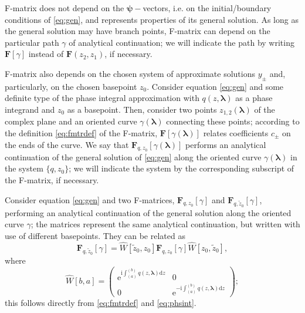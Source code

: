 \documentclass[atmp]{ipart_v1}
\def\rmd{\mathrm{d}}
\def\rme{\mathrm{e}}
\def\rmi{\mathrm{i}}
\def\lmbd{\bm{\lambda}}
\def\psii{\bm\psi}
\def\F{\bm{F}}
\def\W{\widehat{W}}
\newcommand\eref[1]{\eqref{#1}}
\newcommand\phsintgrnd[1][z]{q(#1,\lmbd)}
\newcommand\phsintgrl[3][z]{\int_{#2}^{#3} \phsintgrnd[#1] \rmd #1}
\begin{document}
F-matrix does not depend on the $\psii-$vectors, i.e. on the initial/boundary conditions 
of \eref{eq:gen}, and represents properties of its general solution. 
As long as the general solution may have branch points, 
F-matrix can depend on the particular path $\gamma$ of analytical continuation; 
we will indicate the path by writing $\F[\gamma]$ instead of $\F(z_2,z_1)$, if necessary.
 
F-matrix also depends on the chosen system of approximate solutions $y_\pm$ and, 
particularly, on the chosen basepoint $z_0$. Consider equation \eref{eq:gen} and some definite
type of the phase integral approximation with $q(z,\lmbd)$ as a phase integrand 
and $z_0$ as a basepoint. Then, consider two points $z_{1,2}(\lmbd)$ of the complex plane 
and an oriented curve $\gamma(\lmbd)$ connecting these points; 
according to the definition \eref{eq:fmtrdef} of the F-matrix, 
$\F[\gamma(\lmbd)]$ relates coefficients $c_\pm$ on the ends of the curve. We say 
that $\F_{q,z_0}[\gamma(\lmbd)]$ performs an analytical continuation of the general solution of \eref{eq:gen} 
along the oriented curve $\gamma(\lmbd)$ in the system $\{q,z_0\}$; we will indicate the
system by the corresponding subscript of the F-matrix, if necessary.

Consider equation \eref{eq:gen} and two F-matrices, $\F_{q,z_0}[\gamma]$ and $\F_{q,\tilde{z}_0}[\gamma]$, 
performing an analytical continuation of the general solution along the oriented curve $\gamma$; the matrices
represent the same analytical continuation, but written with use of different basepoints. They can be related as
\begin{equation}
\F_{q,\tilde{z}_0}[\gamma] = \W[\tilde{z}_0,z_0]\F_{q,z_0}[\gamma]\W[z_0,\tilde{z}_0],
\label{eq:bpchange} 
\end{equation}
where
\begin{equation}
\W[b,a] =  
\left(\begin{array}{*{2}{c}}
\rme^{\rmi \phsintgrl{(a)}{(b)}} & 0 \\ 0 & \rme^{-\rmi \phsintgrl{(a)}{(b)}} 
\end{array}\right);
\label{eq:W}
\end{equation}
this follows directly from \eref{eq:fmtrdef} and \eref{eq:phsint}. 
\end{document}
